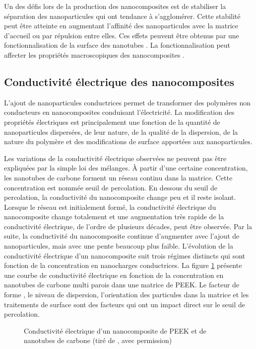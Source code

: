 Un des défis lors de la production des nanocomposites est de stabiliser la séparation des nanoparticules qui ont tendance à s’agglomérer.
Cette stabilité peut être atteinte en augmentant l'affinité des nanoparticules avec la matrice d'accueil ou par répulsion entre elles. 
Ces effets peuvent être obtenus par une fonctionnalisation de la surface des nanotubes \cite{Xie2005}. 
La fonctionnalisation peut affecter les propriétés macroscopiques des nanocomposites \cite{Ma2008}. 

\subsection{Conductivité électrique des nanocomposites}

L'ajout de nanoparticules conductrices permet de transformer des polymères non conducteurs en nanocomposites conduisant l'électricité. 
La modification des propriétés électriques est principalement une fonction de la quantité de nanoparticules dispersées, de leur nature, de la qualité de la dispersion, de la nature du polymère et des modifications de surface apportées aux nanoparticules. 

Les variations de la conductivité électrique observées ne peuvent pas être expliquées par la simple loi des mélanges. 
À partir d'une certaine concentration, les nanotubes de carbone forment un réseau continu dans la matrice. 
Cette concentration est nommée seuil de percolation.
En dessous du seuil de percolation, la conductivité du nanocomposite change peu et il reste isolant. 
Lorsque le réseau est initialement formé, la conductivité électrique du nanocomposite change totalement et une augmentation très rapide de la conductivité électrique, de l'ordre de plusieurs décades, peut être observée. 
Par la suite, la conductivité du nanocomposite continue d'augmenter avec l'ajout de nanoparticules, mais avec une pente beaucoup plus faible. 
L'évolution de la conductivité électrique d'un nanocomposite suit trois régimes distincts qui sont fonction de la concentration en nanocharges conductrices. 
La figure \ref{percolation_electrique} présente une courbe de conductivité électrique en fonction de la concentration en nanotubes de carbone multi parois dans une matrice de PEEK. 
Le facteur de forme \cite{Hu2008}, le niveau de dispersion, l'orientation des particules dans la matrice \cite{Xie2011c} et les traitements de surface sont des facteurs qui ont un impact direct sur le seuil de percolation. 

\begin{figure}[]
	\centering
	\caption{Conductivité électrique d'un nanocomposite de PEEK et de nanotubes de carbone (tiré de \cite{Bangarusampath2009}, avec permission)}
	\label{percolation_electrique}
\end{figure}

